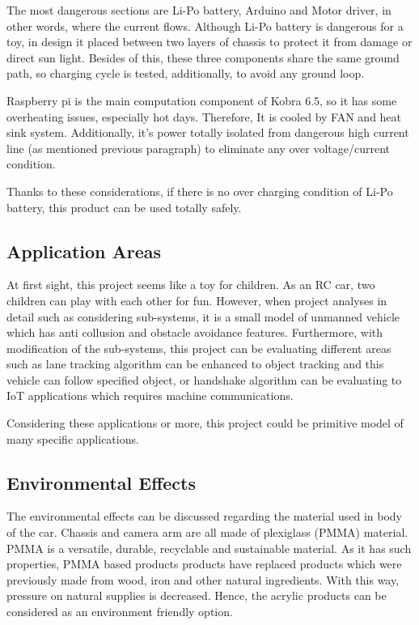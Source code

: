 \documentclass[a4paper,12pt]{article}
\begin{document}
		The most dangerous sections are Li-Po battery, Arduino and Motor driver, in other words, where the current flows. Although Li-Po battery is dangerous for a toy, in design it placed between two layers of chassis to protect it from damage or direct sun light. Besides of this, these three components share the same ground path, so charging cycle is tested, additionally, to avoid any ground loop. 
		
		Raspberry pi is the main computation component of Kobra 6.5, so it has some overheating issues, especially hot days. Therefore, It is cooled by FAN and heat sink system. Additionally, it’s power totally isolated from dangerous high current line (as mentioned previous paragraph) to eliminate any over voltage/current condition. 
		
		Thanks to these considerations, if there is no over charging condition of Li-Po battery, this product can be used totally safely.  
		

	\subsection{Application Areas}
		At first sight, this project seems like a toy for children. As an RC car, two children can play with each other for fun. However, when project analyses in detail such as considering sub-systems, it is a small model of unmanned vehicle which has anti collusion and obstacle avoidance features. Furthermore, with modification of the sub-systems, this project can be evaluating different areas such as lane tracking algorithm can be enhanced to object tracking and this vehicle can follow specified object, or handshake algorithm can be evaluating to IoT applications which requires machine communications.
		
		Considering these applications or more, this project could be primitive model of many specific applications.

	\subsection{Environmental Effects}
	
		The environmental effects can be discussed regarding the material used in body of the car. Chassis and camera arm are all made of plexiglass (PMMA) material. PMMA is a versatile, durable, recyclable and sustainable material. As it has such properties, PMMA based products products have replaced products which were previously made from wood, iron and other natural ingredients. With this way, pressure on natural supplies is decreased. Hence, the acrylic products can be considered as an environment friendly option.
\end{document}

